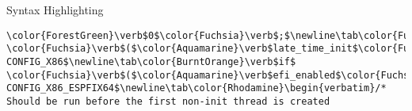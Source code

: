 \begin{frame}{Syntax Highlighting}
\begin{verbatim}
\color{ForestGreen}\verb$0$\color{Fuchsia}\verb$;$\newline\tab\color{Fuchsia}\verb$}$\newline\color{Gray}\verb$#endif$\newline\tab\color{Aquamarine}\verb$page_ext_init$\color{Fuchsia}\verb$($\color{Fuchsia}\verb$)$\color{Fuchsia}\verb$;$\newline\tab\color{Aquamarine}\verb$kmemleak_init$\color{Fuchsia}\verb$($\color{Fuchsia}\verb$)$\color{Fuchsia}\verb$;$\newline\tab\color{Aquamarine}\verb$debug_objects_mem_init$\color{Fuchsia}\verb$($\color{Fuchsia}\verb$)$\color{Fuchsia}\verb$;$\newline\tab\color{Aquamarine}\verb$setup_per_cpu_pageset$\color{Fuchsia}\verb$($\color{Fuchsia}\verb$)$\color{Fuchsia}\verb$;$\newline\tab\color{Aquamarine}\verb$numa_policy_init$\color{Fuchsia}\verb$($\color{Fuchsia}\verb$)$\color{Fuchsia}\verb$;$\newline\tab\color{BurntOrange}\verb$if$ \color{Fuchsia}\verb$($\color{Aquamarine}\verb$late_time_init$\color{Fuchsia}\verb$)$\newline\tab\tab\color{Aquamarine}\verb$late_time_init$\color{Fuchsia}\verb$($\color{Fuchsia}\verb$)$\color{Fuchsia}\verb$;$\newline\tab\color{Aquamarine}\verb$calibrate_delay$\color{Fuchsia}\verb$($\color{Fuchsia}\verb$)$\color{Fuchsia}\verb$;$\newline\tab\color{Aquamarine}\verb$pidmap_init$\color{Fuchsia}\verb$($\color{Fuchsia}\verb$)$\color{Fuchsia}\verb$;$\newline\tab\color{Aquamarine}\verb$anon_vma_init$\color{Fuchsia}\verb$($\color{Fuchsia}\verb$)$\color{Fuchsia}\verb$;$\newline\tab\color{Aquamarine}\verb$acpi_early_init$\color{Fuchsia}\verb$($\color{Fuchsia}\verb$)$\color{Fuchsia}\verb$;$\newline\color{Gray}\verb$#ifdef CONFIG_X86$\newline\tab\color{BurntOrange}\verb$if$ \color{Fuchsia}\verb$($\color{Aquamarine}\verb$efi_enabled$\color{Fuchsia}\verb$($\color{Aquamarine}\verb$EFI_RUNTIME_SERVICES$\color{Fuchsia}\verb$)$\color{Fuchsia}\verb$)$\newline\tab\tab\color{Aquamarine}\verb$efi_enter_virtual_mode$\color{Fuchsia}\verb$($\color{Fuchsia}\verb$)$\color{Fuchsia}\verb$;$\newline\color{Gray}\verb$#endif$\newline\color{Gray}\verb$#ifdef CONFIG_X86_ESPFIX64$\newline\tab\color{Rhodamine}\begin{verbatim}/* Should be run before the first non-init thread is created 
\end{verbatim}
\end{frame}
